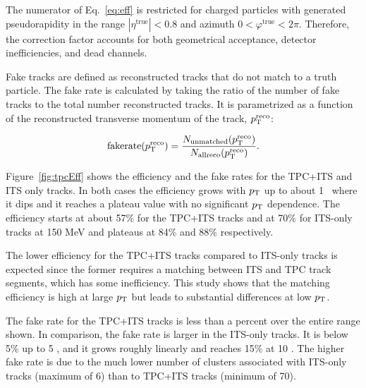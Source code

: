 The numerator of Eq.~\ref{eq:eff} is restricted for charged particles with generated pseudorapidity in the range $|\eta^{\mathrm{true}}|<0.8$ and azimuth $0<\varphi^{\mathrm{true}}<2\pi$. Therefore, the correction factor accounts for both geometrical acceptance, detector inefficiencies, and dead channels.  

Fake tracks are defined as reconstructed tracks that do not match to a truth particle. The fake rate is calculated by taking the ratio of the number of fake tracks to the total number reconstructed tracks. It is parametrized as a function of the reconstructed transverse momentum of the track, $p_{\mathrm{T}}^{\mathrm{reco}}$:

\begin{equation}\label{eq:fakes}
\mathrm{fake rate} (p_{\mathrm{T}}^{\mathrm{reco}}) = \frac{N_{\mathrm{unmatched}}(p_{\mathrm{T}}^{\mathrm{reco}})}{N_{\mathrm{all reco}}(p_{\mathrm{T}}^{\mathrm{reco}})}.
\end{equation}

Figure~\ref{fig:tpcEff} shows the efficiency and the fake rates for the TPC+ITS and ITS only tracks. In both cases the efficiency grows with $p_{\mathrm{T}}$ up to about 1 \GeVc~where it dips and it reaches a plateau value with no significant $p_{\mathrm{T}}$ dependence. The efficiency starts at about 57$\%$ for the TPC+ITS tracks and at 70$\%$ for ITS-only tracks at 150 MeV and plateaus at 84\% and 88\% respectively. %

The lower efficiency for the TPC+ITS tracks compared to ITS-only tracks is expected since the former requires a matching between ITS and TPC track segments, which has some inefficiency. This study shows that the matching efficiency is high at large $p_{\mathrm{T}}$ but leads to substantial differences at low $p_{\mathrm{T}}$.  


The fake rate for the TPC+ITS tracks is less than a percent over the entire range shown. In comparison, the fake rate is larger in the ITS-only tracks. It is below 5\% up to 5 \GeVc, and it grows roughly linearly and reaches 15\%  at 10 \GeVc. The higher fake rate is due to the much lower number of clusters associated with ITS-only tracks (maximum of 6) than to TPC+ITS tracks (minimum of 70).


